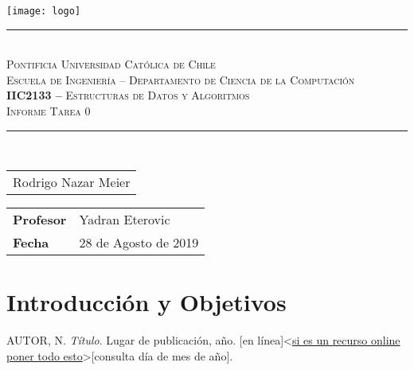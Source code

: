 \documentclass[11pt]{article}
\begin{document}
	\thispagestyle{empty}
	\begin{center}
		\texttt{[image: logo]}\\\large
		\rule[1.75ex]{3in}{0.6pt}\\\vspace{-1.2ex}
		\scshape Pontificia Universidad Católica de Chile\\Escuela de Ingeniería -- Departamento de Ciencia de la Computación\\\vspace{10pc}
		\normalfont\large\sffamily\textbf{IIC2133 --} Estructuras de Datos y Algoritmos\\
		\normalfont\Huge\scshape
		Informe Tarea 0
		\rule[1em]{\linewidth}{2pt}\\\vspace{-1.2ex}
	\end{center}\vspace{2pc}
	\begin{center}\sffamily\begin{tabular}{l}
		\large
		Rodrigo Nazar Meier
		\end{tabular}
	\end{center}
	\vspace{14pc}
	\begin{tabular}{@{}ll}
		\textbf{Profesor}&Yadran Eterovic\\
		\textbf{Fecha}&28 de Agosto de 2019
	\end{tabular}
	\newpage
	\section{Introducción y Objetivos}
	
	
	 

	
	
	
	\begin{thebibliography}{9}
		
		
	\textsc{AUTOR, N.} \textit{Título}. Lugar de publicación, año. [en línea]<\url{si es un recurso online poner todo esto}>[consulta día de mes de año].
		
		
	\end{thebibliography}
\end{document}
